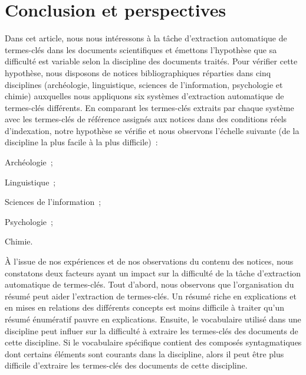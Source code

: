 \section{Conclusion et perspectives}
\label{sec:conclusion_et_perspectives}
  Dans cet article, nous nous intéressons à la tâche d'extraction automatique de
  termes-clés dans les documents scientifiques et émettons l'hypothèse que sa
  difficulté est variable selon la discipline des documents traités. Pour
  vérifier cette hypothèse, nous disposons de notices bibliographiques réparties
  dans cinq disciplines (archéologie, linguistique, sciences de l'information,
  psychologie et chimie) auxquelles nous appliquons six systèmes d'extraction
  automatique de termes-clés différents. En comparant les termes-clés extraits
  par chaque système avec les termes-clés de référence assignés aux notices dans
  des conditions réels d'indexation, notre hypothèse se vérifie et nous
  observons l'échelle suivante (de la discipline la plus facile à la plus
  difficile)~:
  \begin{enumerate*}
    \item{Archéologie~;}
    \item{Linguistique~;}
    \item{Sciences de l'information~;}
    \item{Psychologie~;}
    \item{Chimie.}
  \end{enumerate*}

  À l'issue de nos expériences et de nos observations du contenu des notices,
  nous constatons deux facteurs ayant un impact sur la difficulté de la tâche
  d'extraction automatique de termes-clés. Tout d'abord, nous observons que
  l'organisation du résumé peut aider l'extraction de termes-clés. Un résumé
  riche en explications et en mises en relations des différents concepts est
  moins difficile à traiter qu'un résumé énumératif pauvre en explications.
  Ensuite, le vocabulaire utilisé dans une discipline peut influer sur la
  difficulté à extraire les termes-clés des documents de cette discipline. Si le
  vocabulaire spécifique contient des composés syntagmatiques dont certains
  éléments sont courants dans la discipline, alors il peut être plus difficile
  d'extraire les termes-clés des documents de cette discipline.

